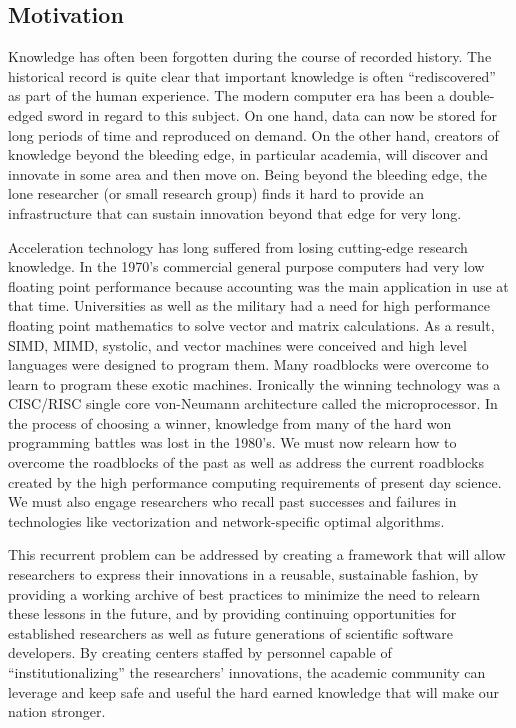 \subsection{Motivation}
Knowledge has often been forgotten during the course of recorded history.
The historical record is quite clear that important knowledge is often ``rediscovered'' as part of the human experience.
The modern computer era has been a double-edged sword in regard to this subject.
On one hand, data can now be stored for long periods of time and reproduced on demand. 
On the other hand, creators of knowledge beyond the bleeding edge, in particular academia,
will discover and innovate in some area and then move on. 
Being beyond the bleeding edge, the lone researcher (or small research group) finds it hard to provide an infrastructure that can sustain innovation beyond that edge for very long.

Acceleration technology has long suffered from losing cutting-edge research knowledge. 
In the 1970's commercial general purpose computers had very low floating point performance because accounting was the main application in use at that time. 
Universities as well as the military had a need for high performance floating point mathematics to solve vector and matrix calculations. 
As a result, SIMD, MIMD, systolic, and vector machines were conceived and high level languages were designed to program them. 
Many roadblocks were overcome to learn to program these exotic machines. 
Ironically the winning technology was a CISC/RISC single core von-Neumann architecture called the microprocessor. 
In the process of choosing a winner, knowledge from many of the hard won programming battles was lost in the 1980's. 
We must now relearn how to overcome the roadblocks of the past as well as address the current roadblocks created by the high performance computing requirements of present day science. 
We must also engage researchers who recall past successes and failures in technologies like vectorization and network-specific optimal algorithms.


This recurrent problem can be addressed by creating a framework that will allow researchers to express their innovations in a reusable, sustainable fashion, 
by providing a working archive of best practices to minimize the need to relearn these lessons in the future, 
and by providing continuing opportunities for established researchers as well as future generations of scientific software developers.
By creating centers staffed by personnel capable of ``institutionalizing'' the researchers' innovations, 
the academic community can leverage and keep safe and useful the hard earned knowledge that will make our nation stronger.



